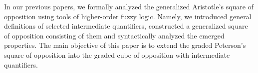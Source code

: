 
In our previous papers, we formally analyzed the generalized Aristotle's square of opposition using tools of higher-order fuzzy logic. Namely, we introduced general definitions of selected intermediate quantifiers, constructed a generalized square of opposition consisting of them and syntactically analyzed the emerged properties. The main objective of this paper is to extend the graded Peterson's square of opposition into the graded cube of opposition with intermediate quantifiers.



